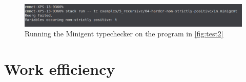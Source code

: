 \begin{figure}
    \centering
    \includegraphics[width=\linewidth]{content/test2result.png}
    \caption{Running the Minigent typechecker on the program in \autoref{fig:test2}}
    \label{fig:test2result}
\end{figure}

\section{Work efficiency}

